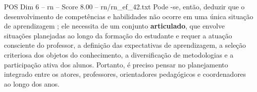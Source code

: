 \begin{textsample}{POS Dim 6 – rn – Score 8.00 – rn/rn\_ef\_42.txt}
Pode -se, então, deduzir que o desenvolvimento de competências e habilidades não ocorre em uma única situação de aprendizagem ; ele necessita de um conjunto \textbf{articulado}, que envolve situações planejadas ao longo da formação do estudante e requer a atuação consciente do professor, a definição das expectativas de aprendizagem, a seleção criteriosa dos objetos do conhecimento, a diversificação de metodologias e a participação ativa dos alunos.
Portanto, é preciso pensar no planejamento integrado entre os atores, professores, orientadores pedagógicos e coordenadores ao longo dos anos.

\end{textsample}
